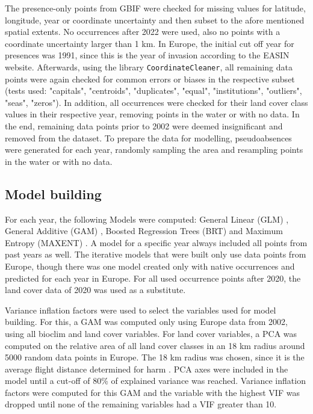 \documentclass[12pt,a4paper]{article}
\begin{document}
The presence-only points from GBIF were checked for missing values for latitude, longitude, year or coordinate uncertainty and then subset to the afore mentioned spatial extents.
No occurrences after 2022 were used, also no points with a coordinate uncertainty larger than 1 km.
In Europe, the initial cut off year for presences was 1991, since this is the year of invasion according to the EASIN website.
Afterwards, using the library \texttt{CoordinateCleaner}, all remaining data points were again checked for common errors or biases in the respective subset (tests used: "capitals", "centroids", "duplicates", "equal", "institutions", "outliers", "seas", "zeros").
In addition, all occurrences were checked for their land cover class values in their respective year, removing points in the water or with no data.
In the end, remaining data points prior to 2002 were deemed insignificant and removed from the dataset.
To prepare the data for modelling, pseudoabsences were generated for each year, randomly sampling the area and resampling points in the water or with no data.

\subsection{Model building}
For each year, the following Models were computed: General Linear (GLM) \autocite{guisan2002glm-gam}, General Additive (GAM) \autocite{guisan2002glm-gam}, Boosted Regression Trees (BRT) \autocite{elith2008brt} and Maximum Entropy (MAXENT) \autocite{phillips2017maxnet}.
A model for a specific year always included all points from past years as well.
The iterative models that were built only use data points from Europe, though there was one model created only with native occurrences and predicted for each year in Europe.
For all used occurrence points after 2020, the land cover data of 2020 was used as a substitute.

Variance inflation factors were used to select the variables used for model building.
For this, a GAM was computed only using Europe data from 2002, using all bioclim and land cover variables. 
For land cover variables, a PCA was computed on the relative area of all land cover classes in an 18 km radius around 5000 random data points in Europe.
The 18 km radius was chosen, since it is the average flight distance determined for \gls{harm} \autocite{jeffries2013flightharmonia}.
PCA axes were included in the model until a cut-off of 80\% of explained variance was reached.
Variance inflation factors were computed for this GAM and the variable with the highest VIF was dropped until none of the remaining variables had a VIF greater than 10.
\end{document}
